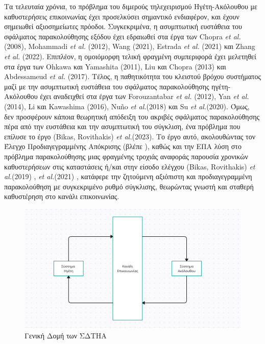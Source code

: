 \bigskip
Τα τελευταία χρόνια, το πρόβλημα του διμερούς τηλεχειρισμού Ηγέτη-Ακόλουθου με καθυστερήσεις επικοινωνίας έχει προσελκύσει σημαντικό ενδιαφέρον, και έχουν σημειωθεί αξιοσημείωτες πρόοδοι. Συγκεκριμένα, η ασυμπτωτική ευστάθεια του σφάλματος παρακολούθησης εξόδου έχει εδραιωθεί στα έργα των Chopra \textit{et al.} (2008)\cite{chopra2008synchronization}, Mohammadi \textit{et al.} (2012)\cite{mohammadi2012control}, Wang (2021)\cite{wang2021bilateral}, Estrada \textit{et al.} (2021)\cite{estrada2021stable} και Zhang \textit{et al.} (2022)\cite{zhang2022adaptive}. Επιπλέον, η ομοιόμορφη τελική φραγμένη συμπεριφορά έχει μελετηθεί στα έργα των Ohkawa και Yamashita (2011)\cite{ohkawa2011passivity}, Liu και Chopra (2013)\cite{liu2013control} και Abdessameud \textit{et al.} (2017)\cite{abdessameud2017leader}. Τέλος, η παθητικότητα του κλειστού βρόχου συστήματος μαζί με την ασυμπτωτική ευστάθεια του σφάλματος παρακολούθησης ηγέτη-Ακόλουθου έχει αναδειχθεί στα έργα των Forouzantabar \textit{et al.} (2012)\cite{forouzantabar2012bilateral}, Yan \textit{et al.} (2014)\cite{yan2014consensus}, Li και Kawashima (2016)\cite{li2016bilateral}, Nuño \textit{et al.}(2018)\cite{nuno2018control} και Su \textit{et al.}(2020)\cite{su2020bilateral}. Όμως, δεν προσφέρουν κάποια θεωρητική απόδειξη του ακριβές σφάλματος παρακολούθησης	πέρα από την ευστάθεια και την ασυμπτωτική του σύγκλιση, ένα πρόβλημα που επίλυσε το έργο (Bikas, Rovithakis) \textit{et al.}(2023)\cite{BIKAS20239972}. Το έργο αυτό, ακολουθώντας τον Έλεγχο Προδιαγεγραμμένης Απόκρισης (βλέπε ), καθώς και την ΕΠΑ λύση στο πρόβλημα παρακολούθησης μιας φραγμένης τροχιάς αναφοράς παρουσία χρονικών καθυστερήσεων στις καταστάσεις ή/και στην είσοδο ελέγχου (Bikas, Rovithakis) \textit{et al.}(2019) \cite{bikas2019enhancing}, \textit{et al.}(2021) \cite{bikas2021prescribed}, κατάφερε την ζητούμενη αξιόπιστη και προδιαγεγραμμένη παρακολούθηση με συγκεκριμένο ρυθμό σύγκλισης, θεωρώντας γνωστή και σταθερή καθυστέρηση στο κανάλι επικοινωνίας.

\bigskip
\begin{figure}[!ht]
  \begin{center}
    \includegraphics[width=1\linewidth]{Chapters/Chapter1/Figures/Generic_Implementation.png}
    \caption[Γενική Δομή των ΣΔΤΗΑ]{Γενική Δομή των ΣΔΤΗΑ}
    \label{generic_implementation}
  \end{center}
\end{figure}

